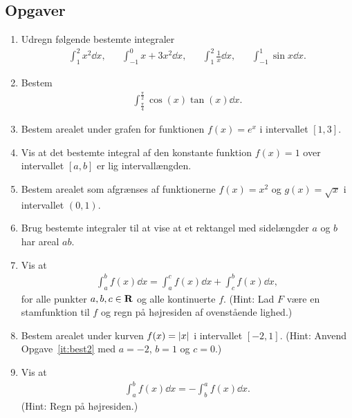 \subsection{Opgaver}

\begin{enumerate}
	\item Udregn følgende bestemte integraler
	\begin{align*}
	\int_1^2 x^2\dd x,&& \int_{-1}^0 x+3x^2\dd x,&& \int_1^2 \frac{1}{x} \dd x,&&\int_{-1}^1\sin x\dd x.
	\end{align*}
	
	\item Bestem
	\begin{align*}
	\int_{\frac{\pi}{4}}^{\frac{\pi}{2}} \cos(x)\tan(x) \dd x.
	\end{align*}
	
	\item Bestem arealet under grafen for funktionen $ f(x)=e^x $ i intervallet $ [1,3] $.
	
	\item Vis at det bestemte integral af den konstante funktion $f(x)=1$ over intervallet $[a,b]$ er lig intervallængden.
	
	\item Bestem arealet som afgrænses af funktionerne $f(x)=x^2$ og $g(x)=\sqrt{x}$ i intervallet $(0,1) $.
	
	\item Brug bestemte integraler til at vise at et rektangel med sidelængder $a$ og $b$ har areal $ab$.
	
	\item \label{it:best2} Vis at 
	\begin{align*}
	\int_a^b f(x)\dd x=\int_a^c f(x)\dd x+\int_c^b f(x)\dd x,
	\end{align*}
	for alle punkter $a,b,c\in \mathbf{R}$ og alle kontinuerte $f$. (Hint: Lad $F$ være en stamfunktion til $f$ og regn på højresiden af ovenstående lighed.) 
	
	\item Bestem arealet under kurven $f(x)=\vert x\vert$ i intervallet $ [-2,1] $. (Hint: Anvend Opgave~\ref{it:best2} med $a=-2$, $b=1$ og $c=0$.)
	

	
	\item \label{it:bes3} Vis at 
	\begin{align*}
	\int_{a}^{b} f(x)\dd x=-\int_{b}^{a} f(x) \dd x.
	\end{align*}
	(Hint: Regn på højresiden.)
	

\end{enumerate}
